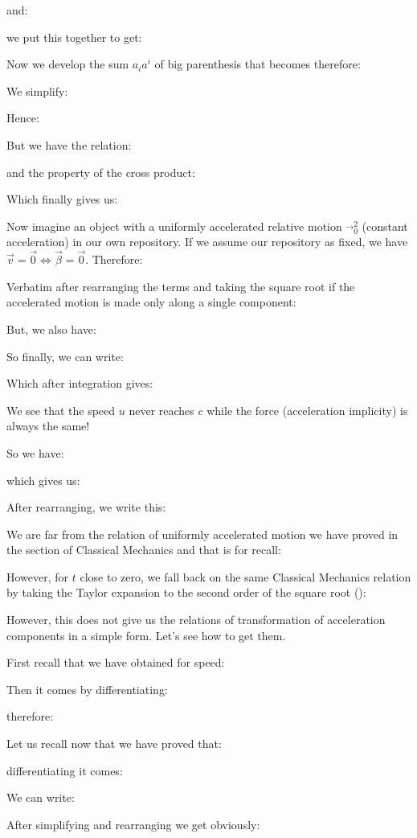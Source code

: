 	and:
	
	we put this together to get:
	
	Now we develop the sum $a_ia^i$ of big parenthesis that becomes therefore:
	
	We simplify:
	
	Hence:
	
	But we have the relation:
	
	and the property of the cross product:
	
	Which finally gives us:
	
	Now imagine an object with a uniformly accelerated relative motion $\vec{}_0^2$ (constant acceleration) in our own repository. If we assume our repository as fixed, we have $\vec{v}=\vec{0}\Leftrightarrow \vec{\beta}=\vec{0}$. Therefore:
	
	Verbatim after rearranging the terms and taking the square root if the accelerated motion is made only along a single component:
	
	But, we also have:
	
	So finally, we can write:
	
	Which after integration gives:
	
	We see that the speed $u$ never reaches $c$ while the force (acceleration implicity) is always the same!

	So we have:
	
	which gives us:
	
	After rearranging, we write this:
	
	We are far from the relation of uniformly accelerated motion we have proved in the section of Classical Mechanics and that is for recall:
	
	However, for $t$ close to zero, we fall back on the same Classical Mechanics relation by taking the Taylor expansion to the second order of the square root ():
	
	However, this does not give us the relations of transformation of acceleration components in a simple form. Let's see how to get them.

	First recall that we have obtained for speed:
	
	Then it comes by differentiating:
	
	therefore:
	
	Let us recall now that we have proved that:
	
	differentiating it comes:
	
	We can write:
	
	After simplifying and rearranging we get obviously:
	
